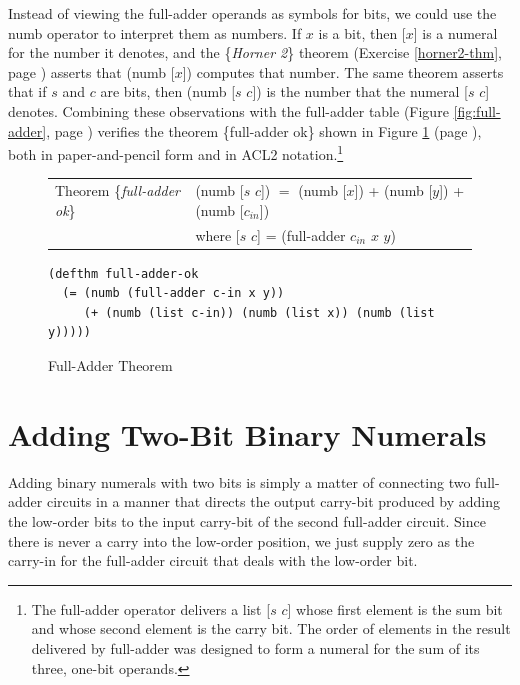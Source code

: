 Instead of viewing the full-adder operands
as symbols for bits, we could use the numb operator
to interpret them as numbers.
If $x$ is a bit, then [$x$] is a numeral for
the number it denotes, and the \{\emph{Horner 2}\} theorem
(Exercise \ref{horner2-thm}, page \pageref{horner2-thm})
asserts that (numb [$x$]) computes that number.
The same theorem asserts that if $s$ and $c$ are bits,
then (numb [$s$ $c$]) is  the number that the numeral [$s$ $c$] denotes.
Combining these observations with the full-adder table
(Figure \ref{fig:full-adder}, page \pageref{fig:full-adder})
verifies the theorem \{full-adder ok\} shown in
Figure \ref{fig:full-adder-thm} (page \pageref{fig:full-adder-thm}),
both in paper-and-pencil form and in ACL2 notation.\footnote{The
full-adder operator delivers a list [$s$ $c$] whose first
element is the sum bit and whose second element is the carry bit.
The order of elements in the result delivered by full-adder was designed
to form a numeral for the sum of its three, one-bit operands.}

\begin{figure}
\begin{center}
\begin{tabular}{ll}
Theorem \{\emph{full-adder ok}\} & (numb [$s$ $c$]) $=$ (numb [$x$]) + (numb [$y$]) + (numb [$c_{in}$]) \\
                                 & where [$s$ $c$] = (full-adder $c_{in}$ $x$ $y$) \\
\end{tabular}
\begin{Verbatim}
(defthm full-adder-ok
  (= (numb (full-adder c-in x y))
     (+ (numb (list c-in)) (numb (list x)) (numb (list y)))))
\end{Verbatim}
\end{center}
\caption{Full-Adder Theorem}
\label{fig:full-adder-thm}
\end{figure}

\section{Adding Two-Bit Binary Numerals}
\label{sec:adding-2-bit-numerals}

Adding binary numerals with two bits is simply a matter
of connecting two full-adder circuits in a manner that
directs the output carry-bit produced by adding the low-order bits
to the input carry-bit of the second full-adder circuit.
Since there is never a carry into the low-order position,
we just supply zero as the carry-in for the full-adder circuit
that deals with the low-order bit.

